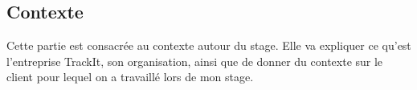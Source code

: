 
\begin{coverpage}
  \chapter{Contexte}

  Cette partie est consacrée au contexte
  autour du stage. Elle va expliquer ce
  qu'est l'entreprise TrackIt, son
  organisation, ainsi que de donner du
  contexte sur le client pour lequel on
  a travaillé lors de mon stage.
\end{coverpage}
